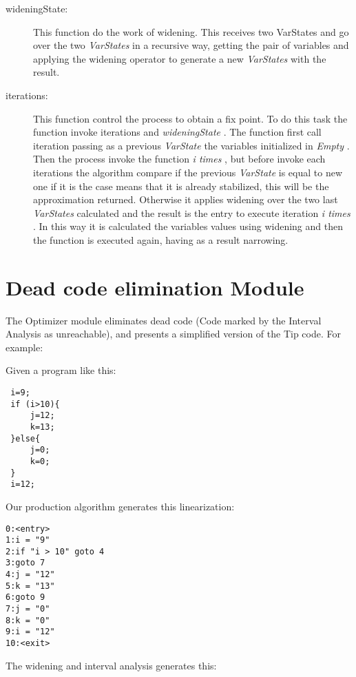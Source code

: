 \documentclass{article}
\begin{document}
\begin{description}
  \item[wideningState:] This function do the work of widening. This receives two VarStates and
    go over the two \emph{ VarStates } in a recursive way, getting the pair of variables and applying
    the widening operator to generate a new \emph{ VarStates } with the result.

  \item[iterations:] This function control the process to obtain a fix point. To do this task the
    function invoke iterations and \emph{ wideningState }. The function first call iteration passing
    as a previous \emph{ VarState } the variables initialized in \emph{ Empty }. Then the process invoke
    the function \emph{ i times }, but before invoke each iterations the algorithm compare if the
    previous \emph{ VarState } is equal to new one if it is the case means that it is already stabilized,
    this will be the approximation returned. Otherwise it applies widening over the two last
    \emph{ VarStates } calculated and the result is the entry to execute iteration \emph{ i times }. In this way it
    is calculated the variables values using widening and then the function is executed again,
    having as a result narrowing.


\end{description}

\section{Dead code elimination Module}

The Optimizer module eliminates dead code (Code marked by the Interval Analysis as unreachable), and presents a simplified version of the Tip code. For example:

Given a program like this:

\begin{verbatim}
 i=9;
 if (i>10){
     j=12;
     k=13;
 }else{
     j=0;
     k=0;
 }
 i=12;
\end{verbatim}
 
Our production algorithm generates this linearization:

\begin{verbatim}
0:<entry>
1:i = "9"
2:if "i > 10" goto 4
3:goto 7
4:j = "12"
5:k = "13"
6:goto 9
7:j = "0"
8:k = "0"
9:i = "12"
10:<exit>
\end{verbatim}

 The widening and interval analysis generates this:
 
\end{document}
